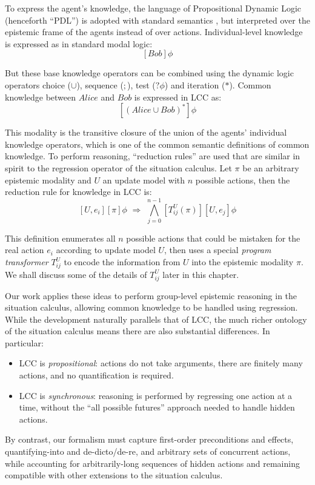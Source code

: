 To express the agent's knowledge, the language of Propositional Dynamic
Logic (henceforth {}``PDL'') is adopted with standard semantics
\citep{harel00dynamic_logic}, but interpreted over the epistemic
frame of the agents instead of over actions. Individual-level knowledge
is expressed as in standard modal logic:\[
[Bob]\phi\]


But these base knowledge operators can be combined using the dynamic
logic operators choice ($\cup$), sequence ($;$), test ($?\phi$)
and iteration ($*$). Common knowledge between $Alice$ and $Bob$
is expressed in LCC as:\[
[(Alice\cup Bob)^{*}]\phi\]


This modality is the transitive closure of the union of the agents'
individual knowledge operators, which is one of the common semantic
definitions of common knowledge. To perform reasoning, {}``reduction
rules'' are used that are similar in spirit to the regression operator
of the situation calculus. Let $\pi$ be an arbitrary epistemic modality
and $U$ an update model with $n$ possible actions, then the reduction
rule for knowledge in LCC is:\[
[U,e_{i}][\pi]\phi\,\,\Rightarrow\,\,\bigwedge_{j=0}^{n-1}[T_{ij}^{U}(\pi)][U,e_{j}]\phi\]


This definition enumerates all $n$ possible actions that could be
mistaken for the real action $e_{i}$ according to update model $U$,
then uses a special \emph{program transformer} $T_{ij}^{U}$ to encode
the information from $U$ into the epistemic modality $\pi$. We shall
discuss some of the details of $T_{ij}^{U}$ later in this chapter.

Our work applies these ideas to perform group-level epistemic reasoning
in the situation calculus, allowing common knowledge to be handled
using regression. While the development naturally parallels that of
LCC, the much richer ontology of the situation calculus means there
are also substantial differences. In particular:

\begin{itemize}
\item LCC is \emph{propositional}: actions do not take arguments, there
are finitely many actions, and no quantification is required. 
\item LCC is \emph{synchronous}: reasoning is performed by regressing one
action at a time, without the {}``all possible futures'' approach
needed to handle hidden actions. 
\end{itemize}
By contrast, our formalism must capture first-order preconditions
and effects, quant\-ifying-into and de-dicto/de-re, and arbitrary
sets of concurrent actions, while accounting for arbitrarily-long
sequences of hidden actions and remaining compatible with other extensions
to the situation calculus.

